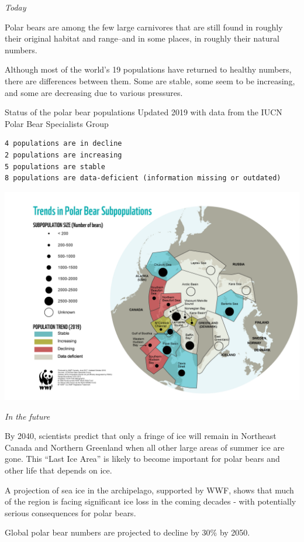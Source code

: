 \documentclass[
]{book}
\begin{document}
\emph{Today}

Polar bears are among the few large carnivores that are still found in roughly their original habitat and range--and in some places, in roughly their natural numbers.

Although most of the world's 19 populations have returned to healthy numbers, there are differences between them. Some are stable, some seem to be increasing, and some are decreasing due to various pressures.

Status of the polar bear populations
Updated 2019 with data from the IUCN Polar Bear Specialists Group

\begin{verbatim}
4 populations are in decline
2 populations are increasing
5 populations are stable
8 populations are data-deficient (information missing or outdated)
\end{verbatim}

\includegraphics{fig/polar_bear_populations.png}

\emph{In the future}

By 2040, scientists predict that only a fringe of ice will remain in Northeast Canada and Northern Greenland when all other large areas of summer ice are gone. This ``Last Ice Area'' is likely to become important for polar bears and other life that depends on ice.

A projection of sea ice in the archipelago, supported by WWF, shows that much of the region is facing significant ice loss in the coming decades - with potentially serious consequences for polar bears.

Global polar bear numbers are projected to decline by 30\% by 2050.
\end{document}
